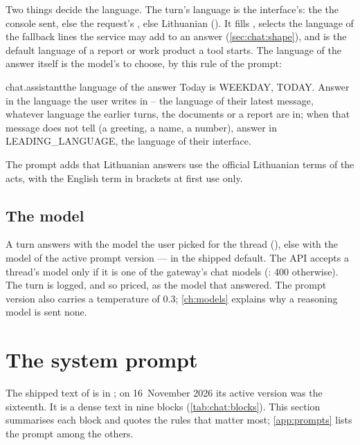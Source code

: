 Two things decide the language. The turn's language is the interface's: the  the
console sent, else the request's , else Lithuanian ().
It fills , selects the language of the fallback lines the service may
add to an answer (\cref{sec:chat:shape}), and is the default language of a report or work
product a tool starts. The language of the answer itself is the model's to choose, by this
rule of the prompt:

\begin{promptexcerpt}{chat.assistant}{the language of the answer}
Today is {WEEKDAY}, {TODAY}. Answer in the language the user writes in – the language of their latest message, whatever language the earlier turns, the documents or a report are in; when that message does not tell (a greeting, a name, a number), answer in {LEADING_LANGUAGE}, the language of their interface.
\end{promptexcerpt}

The prompt adds that Lithuanian answers use the official Lithuanian terms of the acts, with
the English term in brackets at first use only.

\subsection{The model}

A turn answers with the model the user picked for the thread (), else
with the model of the active prompt version ---  in the
shipped default. The API accepts a thread's model only if it is one of the gateway's chat
models (: 400  otherwise). The turn is logged, and so
priced, as the model that answered. The prompt version also carries a temperature of 0.3;
\cref{ch:models} explains why a reasoning model is sent none.


\section{The system prompt}\label{sec:chat:prompt}

The shipped text of  is in
; on 16~November 2026 its active version was the
sixteenth. It is a dense text in nine blocks (\cref{tab:chat:blocks}). This section
summarises each block and quotes the rules that matter most; \cref{app:prompts} lists the
prompt among the others.

